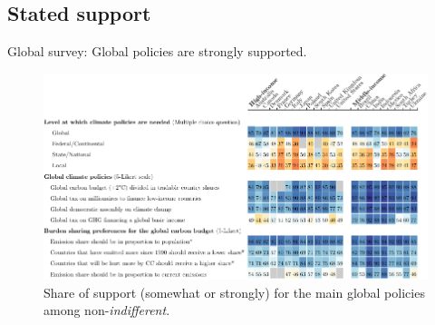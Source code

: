 \documentclass[aspectratio=169,xcolor=dvipsnames, 11pt,mathserif]{beamer}
\begin{document}
\begin{framefont}{\small}

\subsection{Stated support}

\begin{frame}{Global survey: Global policies are strongly supported.\label{global_policies}}
	\vspace{-.3cm}
	\begin{figure}[h!]
		\centering		
		\caption{Share of support (somewhat or strongly) for the main global policies among non-\textit{indifferent}.  \hyperlink{national_policies}{} \hyperlink{national_policies}{}%
        }
        \vspace{-.2cm}
		\includegraphics[height=.9\textheight]{../figures/OECD/Heatplot_global_tax_attitudes_share.pdf} %
		\end{figure}
\end{frame}


\end{framefont}
\end{document}
